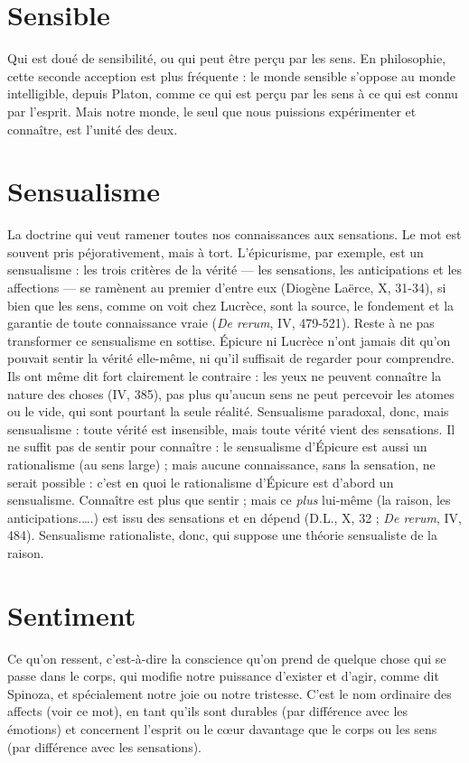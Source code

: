 \section{Sensible}
Qui est doué de sensibilité, ou qui peut être perçu par les sens.
En philosophie, cette seconde acception est plus fréquente : le
monde sensible s'oppose au monde intelligible, depuis Platon, comme ce qui
est perçu par les sens à ce qui est connu par l’esprit. Mais notre monde, le seul
que nous puissions expérimenter et connaître, est l’unité des deux.

\section{Sensualisme}
La doctrine qui veut ramener toutes nos connaissances aux
sensations. Le mot est souvent pris péjorativement, mais à
tort. L’épicurisme, par exemple, est un sensualisme : les trois critères de la
vérité — les sensations, les anticipations et les affections — se ramènent au premier
d’entre eux (Diogène Laërce, X, 31-34), si bien que les sens, comme on
voit chez Lucrèce, sont la source, le fondement et la garantie de toute connaissance
vraie ({\it De rerum}, IV, 479-521). Reste à ne pas transformer ce sensualisme
en sottise. Épicure ni Lucrèce n’ont jamais dit qu’on pouvait sentir la vérité
elle-même, ni qu’il suffisait de regarder pour comprendre. Ils ont même dit fort
clairement le contraire : les yeux ne peuvent connaître la nature des choses (IV,
385), pas plus qu’aucun sens ne peut percevoir les atomes ou le vide, qui sont
pourtant la seule réalité. Sensualisme paradoxal, donc, mais sensualisme : toute
vérité est insensible, mais toute vérité vient des sensations. Il ne suffit pas de
sentir pour connaître : le sensualisme d’Épicure est aussi un rationalisme (au
sens large) ; mais aucune connaissance, sans la sensation, ne serait possible :
c’est en quoi le rationalisme d’Épicure est d’abord un sensualisme. Connaître
est plus que sentir ; mais ce {\it plus} lui-même (la raison, les anticipations.….) est
issu des sensations et en dépend (D.L., X, 32 ; {\it De rerum}, IV, 484). Sensualisme
rationaliste, donc, qui suppose une théorie sensualiste de la raison.

\section{Sentiment}
Ce qu’on ressent, c’est-à-dire la conscience qu’on prend de
quelque chose qui se passe dans le corps, qui modifie notre
puissance d’exister et d’agir, comme dit Spinoza, et spécialement notre joie ou
notre tristesse. C’est le nom ordinaire des affects (voir ce mot), en tant qu'ils
sont durables (par différence avec les émotions) et concernent l'esprit ou le
cœur davantage que le corps ou les sens (par différence avec les sensations).

